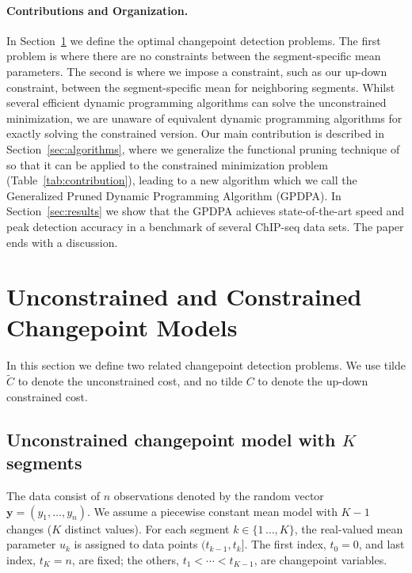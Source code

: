 \documentclass[twoside,11pt]{article}
\begin{document}
\paragraph{Contributions and Organization.} In
Section~\ref{sec:models} we define the optimal changepoint detection
problems. The first problem is where there are no constraints between the
segment-specific mean parameters. The second
is where we impose a constraint, such as our up-down constraint,
between the segment-specific mean for neighboring segments. Whilst
several efficient dynamic programming algorithms can solve the
unconstrained minimization, we are unaware of equivalent dynamic
programming algorithms for exactly solving the constrained version.
Our main contribution is described in Section~\ref{sec:algorithms},
where we generalize the functional pruning technique of
\citet{pruned-dp} so that it can be applied to the constrained
minimization problem (Table~\ref{tab:contribution}), leading to a new
algorithm which we call the Generalized Pruned Dynamic Programming
Algorithm (GPDPA). In Section~\ref{sec:results} we show that the GPDPA
achieves state-of-the-art speed and peak detection accuracy in a
benchmark of several ChIP-seq data sets. The paper ends with a
discussion.

\section{Unconstrained and Constrained Changepoint Models}
\label{sec:models}

In this section we define two related changepoint detection
problems. 
We use tilde $\tilde{C}$
to denote the unconstrained cost, and no tilde $C$ to denote the
up-down constrained cost.

\subsection{Unconstrained changepoint model with $K$ segments}

The data consist of $n$ observations denoted by the random vector
$\mathbf y = (y_1, \dots, y_n)$. 
We assume a piecewise constant mean model with
$K-1$ changes ($K$ distinct values). For each segment
$k\in\{1\,\dots,K\}$, the real-valued mean parameter $u_k$ is assigned
to data points $(t_{k-1},t_k]$. The first index, $t_0=0$, and last
index, $t_K=n$, are fixed; the others, $t_1<\cdots<t_{K-1}$, are
changepoint variables. 
\end{document}
